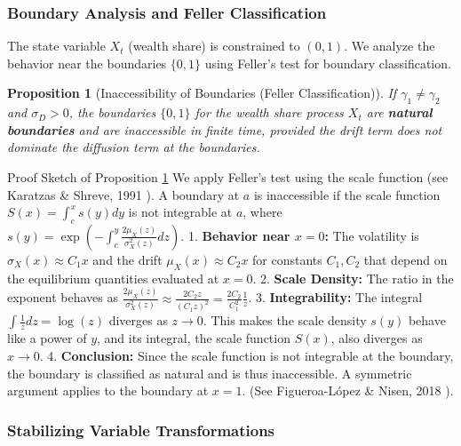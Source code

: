 \documentclass[11pt,letterpaper,oneside]{article}
\theoremstyle{plain}
\newtheorem{proposition}[theorem]{Proposition}
\theoremstyle{definition}
\theoremstyle{remark}
\begin{document}
\subsubsection{Boundary Analysis and Feller Classification}

The state variable $X_t$ (wealth share) is constrained to $(0,1)$. We analyze the behavior near the boundaries $\{0, 1\}$ using Feller's test for boundary classification.

\begin{proposition}[Inaccessibility of Boundaries (Feller Classification)]
\label{prop:feller_classification}
If $\gamma_1 \neq \gamma_2$ and $\sigma_D>0$, the boundaries $\{0, 1\}$ for the wealth share process $X_t$ are \textbf{natural boundaries} and are inaccessible in finite time, provided the drift term does not dominate the diffusion term at the boundaries.
\end{proposition}

\begin{leanproofbox}{Proof Sketch of Proposition \ref{prop:feller_classification}}
We apply Feller's test using the scale function (see Karatzas \& Shreve, 1991 \cite{KaratzasShreve1991}). A boundary at $a$ is inaccessible if the scale function $S(x) = \int_{c}^x s(y) dy$ is not integrable at $a$, where $s(y) = \exp(-\int_{c}^y \frac{2\mu_X(z)}{\sigma_X^2(z)} dz)$.
1.  \textbf{Behavior near $x=0$:} The volatility is $\sigma_X(x) \approx C_1 x$ and the drift $\mu_X(x) \approx C_2 x$ for constants $C_1, C_2$ that depend on the equilibrium quantities evaluated at $x=0$.
2.  \textbf{Scale Density:} The ratio in the exponent behaves as $\frac{2\mu_X(z)}{\sigma_X^2(z)} \approx \frac{2 C_2 z}{(C_1 z)^2} = \frac{2C_2}{C_1^2} \frac{1}{z}$.
3.  \textbf{Integrability:} The integral $\int \frac{1}{z} dz = \log(z)$ diverges as $z \to 0$. This makes the scale density $s(y)$ behave like a power of $y$, and its integral, the scale function $S(x)$, also diverges as $x \to 0$.
4.  \textbf{Conclusion:} Since the scale function is not integrable at the boundary, the boundary is classified as natural and is thus inaccessible. A symmetric argument applies to the boundary at $x=1$. (See Figueroa-López \& Nisen, 2018 \cite{FigueroaNisen2018}).
\end{leanproofbox}

\subsubsection{Stabilizing Variable Transformations}
\label{subsec:GE_transforms}
\end{document}
